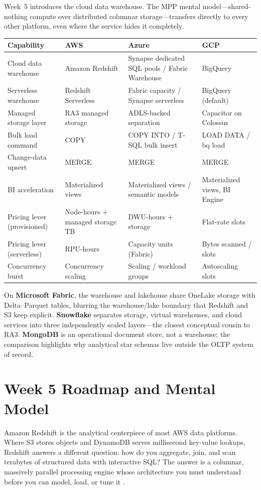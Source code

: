 \begin{crosscloud}
Week~5 introduces the cloud data warehouse. The MPP mental model---shared-nothing compute over distributed columnar storage---transfers directly to every other platform, even where the service hides it completely.

\vspace{2mm}
{\footnotesize
\begin{tabular}{@{}p{2.8cm}p{3.0cm}p{3.0cm}p{3.0cm}@{}}
\toprule
\textbf{Capability} & \textbf{AWS} & \textbf{Azure} & \textbf{GCP} \\
\midrule
Cloud data warehouse & Amazon Redshift & Synapse dedicated SQL pools / Fabric Warehouse & BigQuery \\
Serverless warehouse & Redshift Serverless & Fabric capacity / Synapse serverless & BigQuery (default) \\
Managed storage layer & RA3 managed storage & ADLS-backed separation & Capacitor on Colossus \\
Bulk load command & COPY & COPY INTO / T-SQL bulk insert & LOAD DATA / bq load \\
Change-data upsert & MERGE & MERGE & MERGE \\
BI acceleration & Materialized views & Materialized views / semantic models & Materialized views, BI Engine \\
\addlinespace
Pricing lever (provisioned) & Node-hours + managed storage TB & DWU-hours + storage & Flat-rate slots \\
Pricing lever (serverless) & RPU-hours & Capacity units (Fabric) & Bytes scanned / slots \\
Concurrency burst & Concurrency scaling & Scaling / workload groups & Autoscaling slots \\
\bottomrule
\end{tabular}}

\vspace{1mm}
On \textbf{Microsoft Fabric}, the warehouse and lakehouse share OneLake storage with Delta--Parquet tables, blurring the warehouse/lake boundary that Redshift and S3 keep explicit. \textbf{Snowflake} separates storage, virtual warehouses, and cloud services into three independently scaled layers---the closest conceptual cousin to RA3. \textbf{MongoDB} is an operational document store, not a warehouse; the comparison highlights why analytical star schemas live outside the OLTP system of record.
\end{crosscloud}

\section{Week 5 Roadmap and Mental Model}
Amazon Redshift is the analytical centerpiece of most AWS data platforms. Where S3 stores objects and DynamoDB serves millisecond key-value lookups, Redshift answers a different question: how do you aggregate, join, and scan terabytes of structured data with interactive SQL? The answer is a columnar, massively parallel processing engine whose architecture you must understand before you can model, load, or tune it \cite{awsRedshiftDocs}.


